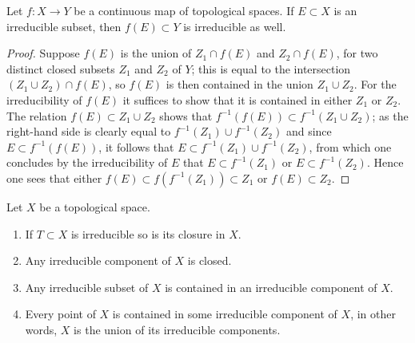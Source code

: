 \begin{lemma}
\label{lemma-image-irreducible-space}
Let $f : X \to Y$ be a continuous map of topological spaces.
If $E \subset X$ is an irreducible subset, then $f(E) \subset Y$
is irreducible as well.
\end{lemma}

\begin{proof}
Suppose $f(E)$ is the union of $Z_1 \cap f(E)$ and $Z_2 \cap f(E)$, for two
distinct closed subsets $Z_1$ and $Z_2$ of $Y$; this is equal to the
intersection $(Z_1 \cup Z_2) \cap f(E)$, so $f(E)$ is then contained in the
union $Z_1 \cup Z_2$.  For the irreducibility of $f(E)$ it suffices to show
that it is contained in either $Z_1$ or $Z_2$. The relation
$f(E) \subset Z_1 \cup Z_2$ shows that
$f^{-1}(f(E)) \subset f^{-1}(Z_1 \cup Z_2)$; as the right-hand side is
clearly equal to $f^{-1}(Z_1) \cup f^{-1}(Z_2)$ and since
$E \subset f^{-1}(f(E))$, it follows that
$E \subset f^{-1}(Z_1) \cup f^{-1}(Z_2)$, from which one concludes by the
irreducibility of $E$ that $E \subset f^{-1}(Z_1)$ or
$E \subset f^{-1}(Z_2)$.  Hence one sees that either
$f(E) \subset f(f^{-1}(Z_1)) \subset Z_1$ or $f(E) \subset Z_2$.
\end{proof}

\begin{lemma}
\label{lemma-irreducible}
Let $X$ be a topological space.
\begin{enumerate}
\item If $T \subset X$ is irreducible so is its closure in $X$.
\item Any irreducible component of $X$ is closed.
\item Any irreducible subset of $X$ is contained in an
irreducible component of $X$.
\item Every point of $X$ is contained in some irreducible component
of $X$, in other words, $X$ is the union of its irreducible components.
\end{enumerate}
\end{lemma}

